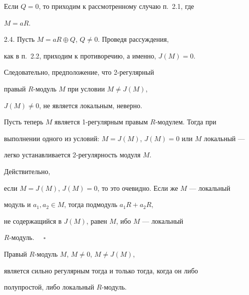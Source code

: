 Если $Q=0$, то приходим к рассмотренному случаю п.~2.1, где


$M=aR$.





2.4. Пусть $M=aR \oplus Q$, $Q\ne 0$. Проведя рассуждения,


как в п.~2.2, приходим к противоречию, а именно, $J(M)=0$.


Следовательно, предположение, что 2-регулярный


правый $R$-модуль $M$ при условии $M \ne J(M)$,


$J(M) \ne 0$, не является локальным, неверно.





Пусть теперь $M$ является 1-регулярным правым $R$-модулем. Тогда при


выполнении одного из условий: $M=J(M)$, $J(M)=0$ или $M$ локальный ---


легко устанавливается 2-регулярность модуля $M$.


Действительно,


если $M=J(M)$, $J(M)=0$, то это очевидно. Если же $M$ --- локальный


модуль и $a_{1},a_{2} \in M$, тогда подмодуль $a_{1}R+a_{2}R$,


не содержащийся в $J(M)$, равен $M$, ибо $M$ --- локальный


$R$-модуль. $\quad\square$





\begin{thm}


Правый $R$-модуль $M$, $M \ne 0$, $M \ne J(M)$,


является сильно регулярным тогда и только тогда, когда он либо


полупростой, либо локальный $R$-модуль.


\end{thm}





